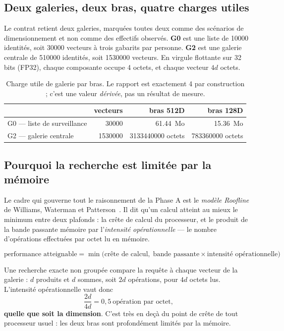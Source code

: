 \documentclass[11pt,a4paper]{article}
\newcommand{\terme}[1]{\emph{#1}}
\begin{document}
\subsection{Deux galeries, deux bras, quatre charges utiles}

Le contrat retient deux galeries, marquées toutes deux comme des scénarios de
dimensionnement et non comme des effectifs observés. \textbf{G0} est une liste de
\num{10000} identités, soit \num{30000} vecteurs à trois gabarits par personne.
\textbf{G2} est une galerie centrale de \num{510000} identités, soit
\num{1530000} vecteurs. En virgule flottante sur 32 bits (FP32), chaque composante
occupe 4 octets, et chaque vecteur $4d$ octets.

\begin{table}[h]
\centering\small
\begin{tabular}{@{}lrrr@{}}
\toprule
& vecteurs & bras 512D & bras 128D \\
\midrule
G0 — liste de surveillance & \num{30000} & \num{61,44}~Mo & \num{15,36}~Mo \\
G2 — galerie centrale & \num{1530000} & \num{3133440000} octets & \num{783360000} octets \\
\bottomrule
\end{tabular}
\caption{Charge utile de galerie par bras. Le rapport est exactement 4 par
construction ; c'est une valeur \emph{dérivée}, pas un résultat de mesure.}
\label{tab:charges}
\end{table}

\subsection{Pourquoi la recherche est limitée par la mémoire}

Le cadre qui gouverne tout le raisonnement de la Phase A est le \terme{modèle
Roofline} de Williams, Waterman et Patterson~\cite{roofline}. Il dit qu'un calcul
atteint au mieux le minimum entre deux plafonds : la crête de calcul du processeur,
et le produit de la bande passante mémoire par l'\terme{intensité opérationnelle} —
le nombre d'opérations effectuées par octet lu en mémoire.

\[
  \text{performance atteignable} = \min\bigl(\text{crête de calcul},\;
  \text{bande passante} \times \text{intensité opérationnelle}\bigr)
\]

Une recherche exacte non groupée compare la requête à chaque vecteur de la galerie :
$d$ produits et $d$ sommes, soit $2d$ opérations, pour $4d$ octets lus.
L'intensité opérationnelle vaut donc
\[
  \frac{2d}{4d} = 0{,}5 \ \text{opération par octet},
\]
\textbf{quelle que soit la dimension}. C'est très en deçà du point de crête de
tout processeur usuel : les deux bras sont profondément limités par la mémoire.
\end{document}
